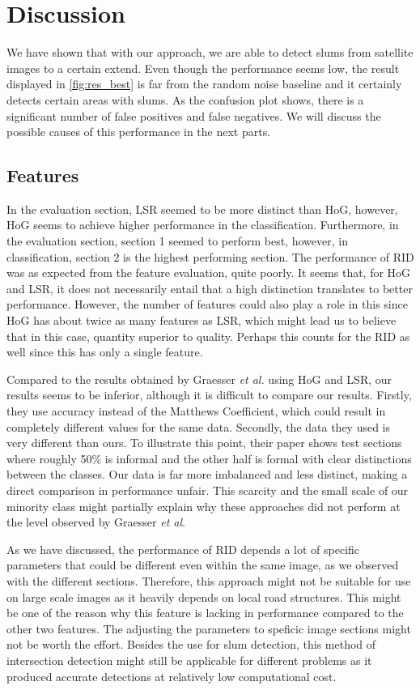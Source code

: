 \section{Discussion}
We have shown that with our approach, we are able to detect slums from satellite images to a certain extend. Even though the performance seems low, the result displayed in \ref{fig:res_best} is far from the random noise baseline and it certainly detects certain areas with slums. As the confusion plot shows, there is a significant number of false positives and false negatives. We will discuss the possible causes of this performance in the next parts.

\subsection{Features}
In the evaluation section, LSR seemed to be more distinct than HoG, however, HoG seems to achieve higher performance in the classification. Furthermore, in the evaluation section, section 1 seemed to perform best, however, in classification, section 2 is the highest performing section. The performance of RID was as expected from the feature evaluation, quite poorly. It seems that, for HoG and LSR, it does not necessarily entail that a high distinction translates to better performance. However, the number of features could also play a role in this since HoG has about twice as many features as LSR, which might lead us to believe that in this case, quantity superior to quality. Perhaps this counts for the RID as well since this has only a single feature.

Compared to the results obtained by Graesser \textit{et al.} using HoG and LSR, our results seems to be inferior, although it is difficult to compare our results. Firstly, they use accuracy instead of the Matthews Coefficient, which could result in completely different values for the same data. Secondly, the data they used is very different than ours. To illustrate this point, their paper shows test sections where roughly 50\% is informal and the other half is formal with clear distinctions between the classes. Our data is far more imbalanced and less distinct, making a direct comparison in performance unfair. This scarcity and the small scale of our minority class might partially explain why these approaches did not perform at the level observed by Graesser \textit{et al}.

As we have discussed, the performance of RID depends a lot of specific parameters that could be different even within the same image, as we observed with the different sections. Therefore, this approach might not be suitable for use on large scale images as it heavily depends on local road structures. This might be one of the reason why this feature is lacking in performance compared to the other two features. The adjusting the parameters to speficic image sections might not be worth the effort. Besides the use for slum detection, this method of intersection detection might still be applicable for different problems as it produced accurate detections at relatively low computational cost.

